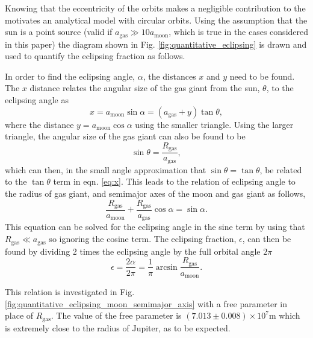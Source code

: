 \documentclass[12pt, onecolumn]{revtex4-2}    %
\begin{document}
Knowing that the eccentricity of the orbits makes a negligible contribution to the motivates an analytical model with circular orbits.
Using the assumption that the sun is a point source (valid if $a_\text{gas} \gg 10a_\text{moon}$, which is true in the cases considered in this paper) the diagram shown in Fig. \ref{fig:quantitative_eclipsing} is drawn and used to quantify the eclipsing fraction as follows.

In order to find the eclipsing angle, $\alpha$, the distances $x$ and $y$ need to be found.
The $x$ distance relates the angular size of the gas giant from the sun, $\theta$, to the eclipsing angle as
\begin{equation}
  x = a_\text{moon} \sin \alpha = (a_\text{gas} + y) \tan \theta,
  \label{eq:x}
\end{equation}
where the distance $y = a_\text{moon} \cos \alpha$ using the smaller triangle.
Using the larger triangle, the angular size of the gas giant can also be found to be
\begin{equation}
  \sin \theta = \frac{R_\text{gas}}{a_\text{gas}},
  \label{eq:sintheta}
\end{equation}
which can then, in the small angle approximation that $\sin\theta = \tan\theta$, be related to the $\tan \theta$ term in eqn. \eqref{eq:x}.
This leads to the relation of eclipsing angle to the radius of gas giant, and semimajor axes of the moon and gas giant as follows,
\begin{equation}
  \frac{R_\text{gas}}{a_\text{moon}} + \frac{R_\text{gas}}{a_\text{gas}}\cos\alpha = \sin\alpha .
  \label{eq:alpha}
\end{equation}
This equation can be solved for the eclipsing angle in the sine term by using that $R_\text{gas} \ll a_\text{gas}$ so ignoring the cosine term.
The eclipsing fraction, $\epsilon$, can then be found by dividing 2 times the eclipsing angle by the full orbital angle $2\pi$
\begin{equation}
  \epsilon = \frac{2\alpha}{2\pi} = \frac{1}{\pi}\arcsin{\frac{R_\text{gas}}{a_\text{moon}}} .
  \label{eq:eclipsing_fraction}
\end{equation}

This relation is investigated in Fig. \ref{fig:quantitative_eclipsing_moon_semimajor_axis} with a free parameter in place of $R_\text{gas}$.
The value of the free parameter is $(7.013\pm 0.008) \times 10^7 \text{m}$ which is extremely close to the radius of Jupiter, as to be expected.
\end{document}
